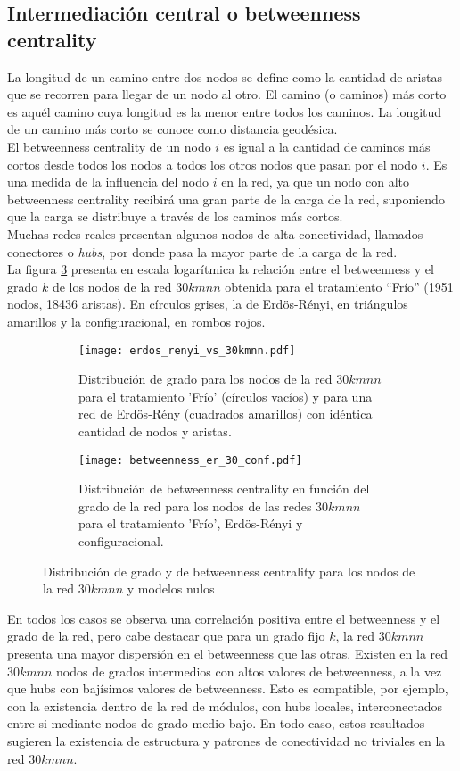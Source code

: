 \subsection*{Intermediación central o betweenness centrality}
La longitud de un camino entre dos nodos se define como la cantidad de aristas que se recorren para llegar de un nodo al otro. El camino (o caminos) más corto es aquél camino cuya longitud es la menor entre todos los caminos. La longitud de un camino más corto se conoce como distancia geodésica.\\
El betweenness centrality de un nodo $i$ es igual a la cantidad de caminos más cortos desde todos los nodos a todos los otros nodos que pasan por el nodo $i$. Es una medida de la influencia del nodo $i$ en la red, ya que un nodo con alto betweenness centrality recibirá una gran parte de la carga de la red, suponiendo que la carga se distribuye a través de los caminos más cortos.\\
Muchas redes reales presentan algunos nodos de alta conectividad, llamados conectores o \textit{hubs}, por donde pasa la mayor parte de la carga de la red.\\
La figura \ref{fig:betweenness_er_30_conf} presenta en escala logarítmica la relación entre el betweenness y el grado $k$ de los nodos de la red $30kmnn$ obtenida para el tratamiento ``Frío'' (1951 nodos, 18436 aristas). En círculos grises, la de Erdös-Rényi, en triángulos amarillos y la configuracional, en rombos rojos.\\
\begin{figure}[H]
    \centering
    \begin{subfigure}[t]{0.45\textwidth}
    \centering
    \texttt{[image: erdos\_renyi\_vs\_30kmnn.pdf]}
    \caption{Distribución de grado para los nodos de la red $30kmnn$ para el tratamiento 'Frío' (círculos vacíos) y para una red de Erdös-Rény (cuadrados amarillos) con idéntica cantidad de nodos y aristas.}
    \label{fig:erdos_renyi_vs_30kmnn}
    \end{subfigure}    
    \centering
    \begin{subfigure}[t]{0.45\textwidth}
    \centering
    \texttt{[image: betweenness\_er\_30\_conf.pdf]}
    \caption{Distribución de betweenness centrality en función del grado de la red para los nodos de las redes $30kmnn$ para el tratamiento 'Frío', Erdös-Rényi y configuracional.}
    \label{fig:betweenness_er_30_conf}
    \end{subfigure}        
    \caption{Distribución de grado y de betweenness centrality para los nodos de la red $30kmnn$ y modelos nulos}
\end{figure}
En todos los casos se observa una correlación positiva entre el betweenness y el grado de la red, pero cabe destacar que para un grado fijo $k$, la red $30kmnn$ presenta una mayor dispersión en el betweenness que las otras. Existen en la red $30kmnn$ nodos de grados intermedios con altos valores de betweenness, a la vez que hubs con bajísimos valores de betweenness. Esto es compatible, por ejemplo, con la existencia dentro de la red de módulos, con hubs locales, interconectados entre si mediante nodos de grado medio-bajo. En todo caso, estos resultados sugieren la existencia de estructura y patrones de conectividad no triviales en la red $30kmnn$.
